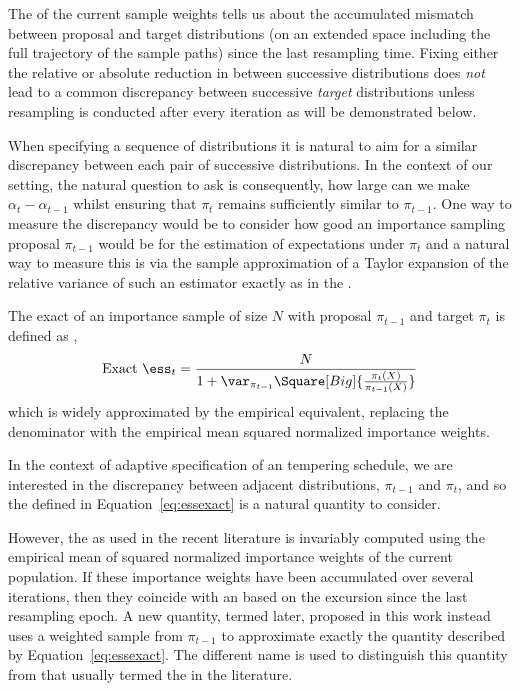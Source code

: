 The \ess of the current sample weights tells us about the accumulated mismatch between proposal and target distributions (on an extended space including the full trajectory of the sample paths) since the last resampling time. Fixing either the relative or absolute reduction in \ess between successive distributions does \emph{not} lead to a common discrepancy between successive \emph{target} distributions unless resampling is conducted after every iteration as will be demonstrated below.

When specifying a sequence of distributions it is natural to aim for a similar discrepancy between each pair of successive distributions. In the context of our setting, the natural question to ask is consequently, how large can we make $\alpha_t - \alpha_{t-1}$ whilst ensuring that $\pi_{t}$ remains sufficiently similar to $\pi_{t-1}$. One way to measure the discrepancy would be to consider how good an importance sampling proposal $\pi_{t-1}$ would be for the estimation of expectations under $\pi_t$ and a natural way to measure this is via the sample approximation of a Taylor expansion of the relative variance of such an estimator exactly as in the \ess.

The exact \ess of an importance sample of size $N$ with proposal $\pi_{t-1}$ and target $\pi_t$ is defined as \cite{Kong:1994ul},
\begin{equation}
  \text{Exact }\ess_t =
  \frac{N}{1 + \var_{\pi_{t-1}}\Square[Big]{\frac{\pi_t(X)}{\pi_{t-1}(X)}}}
  \label{eq:essexact}
\end{equation}
which is widely approximated by the empirical equivalent, replacing the denominator with the empirical mean squared normalized importance weights.

In the context of adaptive specification of an \smc tempering schedule, we are interested in the discrepancy between adjacent distributions, $\pi_{t-1}$ and $\pi_t$, and so the \ess defined in Equation~\eqref{eq:essexact} is a natural quantity to consider.

However, the \ess as used in the recent \smc literature is invariably computed using the empirical mean of squared normalized importance weights of the current population. If these importance weights have been accumulated over several iterations, then they coincide with an \ess based on the excursion since the last resampling epoch. A new quantity, termed \emph{\cess} later, proposed in this work instead uses a weighted sample from $\pi_{t-1}$ to approximate exactly the quantity described by Equation~\eqref{eq:essexact}. The different name is used to distinguish this quantity from that usually termed the \ess in the \smc literature.

